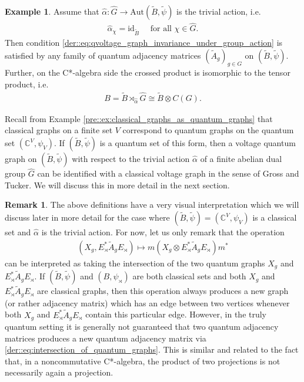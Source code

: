 \documentclass{amsart}
\newcommand{\C}{\mathbb{C}}
\theoremstyle{definition}
\newtheorem{remark}[thm]{Remark}
\newtheorem{example}[thm]{Example}
\theoremstyle{definition}
\begin{document}
\begin{example}
    \label{der::ex:classical_voltage_graphs_as_quantum_voltage_graphs}
    Assume that $\hat{\alpha}: \hat{G} \to \mathrm{Aut}(\tilde{B}, \tilde{\psi})$ is the trivial action, i.e.
    \begin{align*}
        \hat{\alpha}_\chi = \mathrm{id}_{\tilde{B}} \quad \text{ for all } \chi \in \hat{G}.
    \end{align*}
    Then condition \eqref{der::eq:qvoltage_graph_invariance_under_group_action} is satisfied by any family of quantum adjacency matrices $(\tilde{A}_g)_{g \in G}$ on $(\tilde{B}, \tilde{\psi})$. Further, on the C*-algebra side the crossed product is isomorphic to the tensor product, i.e.
    \begin{align*}
        B = \tilde{B} \rtimes_{\hat{\alpha}} \hat{G} \cong \tilde{B} \otimes C(G).
    \end{align*}

    Recall from Example \ref{pre::ex:classical_graphs_as_quantum_graphs} that classical graphs on a finite set $V$ correspond to quantum graphs on the quantum set $(\C^V, \psi_V)$. If $(\tilde{B}, \tilde{\psi})$ is a quantum set of this form, then a voltage quantum graph on $(\tilde{B}, \tilde{\psi})$ with respect to the trivial action $\hat{\alpha}$ of a finite abelian dual group $\hat{G}$ can be identified with a classical voltage graph in the sense of Gross and Tucker. We will discuss this in more detail in the next section.
\end{example}

\begin{remark}
    \label{der::rem:intersection_of_qgraphs}
    The above definitions have a very visual interpretation which we will discuss later in more detail for the case where $(\tilde{B}, \tilde{\psi}) = (\C^V, \psi_V)$ is a classical set and $\hat{\alpha}$ is the trivial action.
    For now, let us only remark that the operation
    \begin{align}
        \label{der::eq:intersection_of_quantum_graphs}
        (X_g, E_\rtimes^\ast \tilde{A}_g E_\rtimes) \mapsto m(X_g \otimes E_\rtimes^\ast \tilde{A}_g E_\rtimes) m^\ast
    \end{align}
    can be interpreted as taking the intersection of the two quantum graphs $X_g$ and $E_\rtimes^\ast \tilde{A}_g E_\rtimes$. If $(\tilde{B}, \tilde{\psi})$ and $(B, \psi_\rtimes)$ are both classical sets and both $X_g$ and $E_\rtimes^\ast \tilde{A}_g E_\rtimes$ are classical graphs, then this operation always produces a new graph (or rather adjacency matrix) which has an edge between two vertices whenever both $X_g$ and $E_\rtimes^\ast \tilde{A}_g E_\rtimes$ contain this particular edge. However, in the truly quantum setting it is generally not guaranteed that two quantum adjacency matrices produces a new quantum adjacency matrix via \eqref{der::eq:intersection_of_quantum_graphs}. This is similar and related to the fact that, in a noncommutative C*-algebra, the product of two projections is not necessarily again a projection.
\end{remark}
\end{document}
